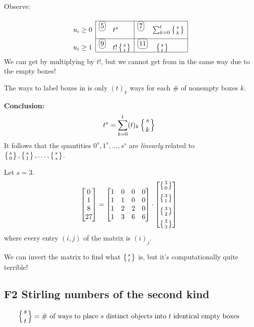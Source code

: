 \documentclass[12pt]{article}
\begin{document}
\rmk Observe: \[\begin{array}[t]{l|l|l|}
    \cline{2-3}
    u_i\geq 0 & {^{\circled{5}}\quad} t^s&{^{\circled{7}}\quad} \sum_{k=0}^{t}\squig{s}{k}\\[6pt]\cline{2-3}
    u_i\geq 1 & {^{\circled{9}}\quad}t!\squig{s}{t}& {^{\circled{11}}\quad}\squig{s}{t}\\
    \cline{2-3}
\end{array}\]
We can get  by multiplying  by $t!$, but we cannot get  from  in the same way due to the empty boxes!

The ways to label boxes in  is only $(t)_k$ ways for each \# of nonempty boxes $k$.

\textbf{Conclusion: } \[t^s = \sum_{k=0}^{t}(t)_k\left\{{s \atop k}\right\}\]
It follows that the quantities $0^s, 1^s,\dots ,s^s$ are \textit{linearly} related to $\left\{{s \atop 0}\right\}, \left\{{s \atop 1}\right\},\dots, \left\{{s \atop s}\right\}$.

\eg Let $s=3$. \[
    \begin{bmatrix}
        0\\1\\8\\27
    \end{bmatrix} =
    \begin{bmatrix}
        1&0&0&0\\
        1&1&0&0\\
        1&2&2&0\\
        1&3&6&6
    \end{bmatrix}\cdot
    \begin{bmatrix}
        \left\{{3 \atop 0}\right\}\\[6pt]\left\{{3 \atop 1}\right\}\\[6pt]\left\{{3 \atop 2}\right\}\\[6pt]\left\{{3 \atop 3}\right\}
    \end{bmatrix}
    \]
where every entry $(i,j)$ of the matrix is $(i)_j$.

We can invert the matrix to find what $\left\{{s \atop t}\right\}$ is, but it's computationally quite terrible!

\subsection{F2 Stirling numbers of the second kind}

 \[\left\{{s \atop t}\right\}=\text{\# of ways to place $s$ distinct objects into $t$ identical empty boxes}\]
\end{document}
